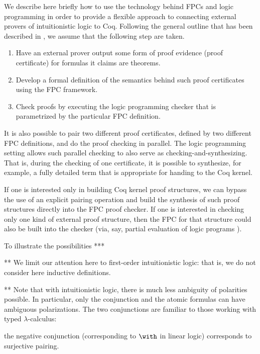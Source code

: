 We describe here briefly how to use the technology behind FPCs and
logic programming in order to provide a flexible approach to
connecting external provers of intuitionistic logic to Coq.
%
Following the general outline that has been described in
\cite{blanco17cade}, we assume that the following step are taken.
%
\begin{enumerate}
\item Have an external prover output some form of proof evidence
  (proof certificate) for formulas it claims are theorems.

\item Develop a formal definition of the semantics behind such proof
  certificates using the FPC framework.

\item Check proofs by executing the logic programming checker that is
  parametrized by the particular FPC definition.
\end{enumerate}
%
It is also possible to pair two different proof certificates, defined
by two different FPC definitions, and do the proof checking in
parallel.  The logic programming setting allows such parallel checking
to also serve as checking-and-synthesizing.  That is, during the
checking of one certificate, it is possible to synthesize, for
example, a fully detailed term that is appropriate for handing to the
Coq kernel.

If one is interested only in building Coq kernel proof structures, we
can bypass the use of an explicit pairing operation and build the
synthesis of such proof structures directly into the FPC proof
checker.  If one is interested in checking only one kind of external
proof structure, then the FPC for that structure could also be built
into the checker (via, say, partial evaluation of logic programs
\cite{lloyd91jlp}).

To illustrate the possibilities ***



** We limit our attention here to first-order intuitionistic logic:
that is, we do not consider here inductive definitions.

** Note that with intuitionistic logic, there is much less ambiguity
of polarities possible.  In particular, only the conjunction and the
atomic formulas can have ambiguous polarizations.  The two
conjunctions are familiar to those working with typed
$\lambda$-calculus: 

the negative conjunction (corresponding to $\with$ in linear logic)
corresponds to surjective pairing.

